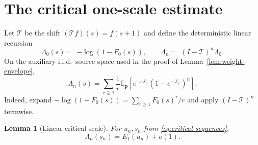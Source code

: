 \documentclass[journal]{IEEEtran}
\theoremstyle{plain}
\newtheorem{lemma}[theorem]{Lemma}
\theoremstyle{definition}
\theoremstyle{remark}
\newcommand{\Eaux}{\mathbb E_{\mathbf p}}
\begin{document}
\section{The critical one-scale estimate}\label{app:critical}

Let $\mathcal T$ be the shift $(\mathcal Tf)(s)=f(s+1)$ and define the deterministic linear recursion
\begin{equation}\label{eq:linear-recursion}
 \Lambda_0(s):=-\log(1-F_0(s)),
 \qquad
 \Lambda_n:=(I-\mathcal T)^n\Lambda_0.
\end{equation}
On the auxiliary i.i.d.\ source space used in the proof of Lemma~\ref{lem:weight-envelope},
\begin{equation}\label{eq:linear-renewal-representation}
 \Lambda_n(s)=\sum_{r\ge1}\frac1r
 \Eaux\left[e^{-s\Sigma_r}(1-e^{-\Sigma_r})^n\right].
\end{equation}
Indeed, expand $-\log(1-F_0(s))=\sum_{r\ge1}F_0(s)^r/r$ and apply $(I-\mathcal T)^n$ termwise.

\begin{lemma}[Linear critical scale]\label{lem:linear-critical}
For $u_n,s_n$ from \eqref{eq:critical-sequences},
\begin{equation}\label{eq:linear-critical}
 \Lambda_n(s_n)=E_1(u_n)+o(1).
\end{equation}
\end{lemma}
\end{document}

